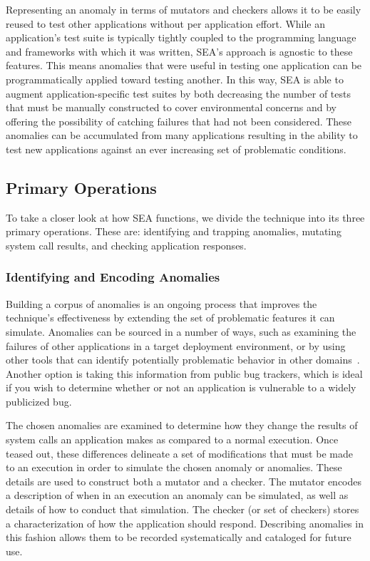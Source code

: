 Representing an anomaly in terms of mutators and checkers
allows it to be easily reused to test other applications
without per application effort.
While an application's test suite is typically
tightly coupled to the programming language
and frameworks with which it was written,
SEA's approach is agnostic to these features.
This means anomalies that were useful in testing one application
can be programmatically applied toward testing another.
In this way, SEA is able to augment application-specific test suites
by both decreasing the number of tests
that must be manually constructed
to cover environmental concerns
and by offering the possibility of catching
failures that had not been considered.
These anomalies can be accumulated from many applications
resulting in the ability to test new applications
against an ever increasing
set of problematic conditions.

\subsection{Primary Operations}
\label{SEC:PrimaryOperations}

To take a closer look at how SEA functions,
we divide the technique
into its three primary operations.
These are:
identifying and trapping anomalies,
mutating system call results,
and checking application responses.

\subsubsection{Identifying and Encoding Anomalies}
\label{SUBSUB:IdentifyingAndEncoding}
Building a corpus of anomalies
is an ongoing process that improves the technique's
effectiveness by extending the set of problematic features it can simulate.
Anomalies can be sourced
in a number of ways,
such as
examining the failures of other applications
in a target deployment environment,
or by using other tools that can identify
potentially problematic behavior in other domains~\cite{Zhuang_NSDI_2014,
rasley2015detecting}.
Another option is taking this information from
public bug trackers, which is ideal
if you wish to determine
whether or not an application
is vulnerable to a widely publicized bug.

The chosen anomalies are examined
to determine how they change the results
of system calls an application makes as
compared to a normal execution.
Once teased out,
these differences delineate
a set of modifications
that must be made to an execution
in order to simulate the chosen anomaly or anomalies.
These details are used to
construct both a mutator and a checker.
The mutator encodes
a description of when in an execution an anomaly can be simulated,
as well as details of how to conduct that simulation.
The checker
(or set of checkers)
stores a characterization of
how the application should respond.
Describing anomalies in this fashion
allows them to be recorded systematically and cataloged for future use.

